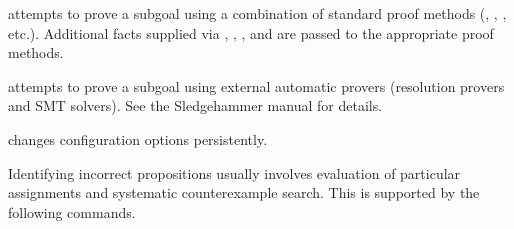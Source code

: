 \begin{isabellebody}
\begin{isamarkuptext}
\begin{description}
  \item \hyperlink{command.HOL.try}{\mbox{}} attempts to prove a subgoal using a combination
    of standard proof methods (, , , etc.).
    Additional facts supplied via , ,
    , and  are passed to the appropriate proof
    methods.

  \item \hyperlink{command.HOL.sledgehammer}{\mbox{}} attempts to prove a subgoal using external
    automatic provers (resolution provers and SMT solvers). See the Sledgehammer
    manual \cite{isabelle-sledgehammer} for details.

  \item \hyperlink{command.HOL.sledgehammer-params}{\mbox{}} changes
    \hyperlink{command.HOL.sledgehammer}{\mbox{}} configuration options persistently.

  \end{description}%
\end{isamarkuptext}%
\isamarkuptrue%
%
\isamarkuptrue%
%
\begin{isamarkuptext}%
Identifying incorrect propositions usually involves evaluation of
  particular assignments and systematic counterexample search.  This
  is supported by the following commands.


\end{isamarkuptext}
\end{isabellebody}
